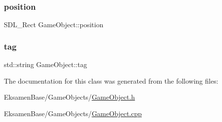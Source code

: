 \mbox{\label{class_game_object_af6009d73be98a4bd54272d06b50f2eac}} 
\subsubsection{\texorpdfstring{position}{position}}
{\footnotesize\ttfamily S\+D\+L\+\_\+\+Rect Game\+Object\+::position}

\mbox{\label{class_game_object_a66891b8bfd67373dde0155ae7808bbb4}} 
\subsubsection{\texorpdfstring{tag}{tag}}
{\footnotesize\ttfamily std\+::string Game\+Object\+::tag}



The documentation for this class was generated from the following files\+:\begin{DoxyCompactItemize}
\item 
Eksamen\+Base/\+Game\+Objects/\mbox{\hyperlink{_game_object_8h}{Game\+Object.\+h}}\item 
Eksamen\+Base/\+Game\+Objects/\mbox{\hyperlink{_game_object_8cpp}{Game\+Object.\+cpp}}\end{DoxyCompactItemize}
